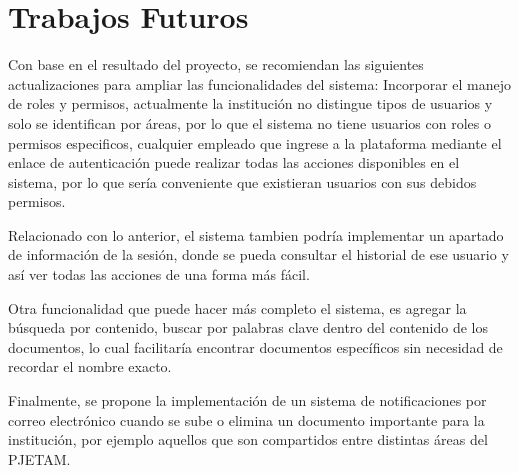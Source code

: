 \section{Trabajos Futuros}
Con base en el resultado del proyecto, se recomiendan las siguientes actualizaciones para ampliar las funcionalidades del sistema:
Incorporar el manejo de roles y permisos, actualmente la institución no distingue tipos de usuarios y solo se identifican por áreas, por lo que el sistema no tiene usuarios con roles o permisos especificos, cualquier empleado que ingrese a la plataforma mediante el enlace de autenticación puede realizar todas las acciones disponibles en el sistema, por lo que sería conveniente que existieran usuarios con sus debidos permisos. 

Relacionado con lo anterior, el sistema tambien podría implementar un apartado de información de la sesión, donde se pueda consultar el historial de ese usuario y así ver todas las acciones de una forma más fácil.

Otra funcionalidad que puede hacer más completo el sistema, es agregar la búsqueda por contenido, buscar por palabras clave dentro del contenido de los documentos, lo cual facilitaría encontrar documentos específicos sin necesidad de recordar el nombre exacto.

Finalmente, se propone la implementación de un sistema de notificaciones por correo electrónico cuando se sube o elimina un documento importante para la institución, por ejemplo aquellos que son compartidos entre distintas áreas del PJETAM.